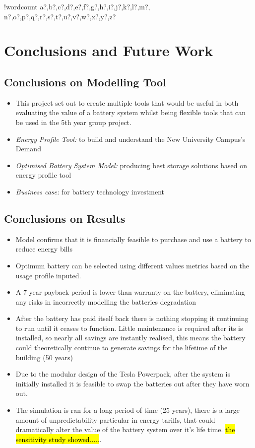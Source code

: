 \documentclass[fontsize=9.5pt]{extarticle}
\numberwithin{figure}{section} %
\providecommand{\tightlist}{%
  \setlength{\itemsep}{0pt}\setlength{\parskip}{0pt}}
\newcounter{words}
\newenvironment{counted}{%
  \setcounter{words}{0}
  \SearchList!{wordcount}{\stepcounter{words}}
    {a?,b?,c?,d?,e?,f?,g?,h?,i?,j?,k?,l?,m?,
    n?,o?,p?,q?,r?,s?,t?,u?,v?,w?,x?,y?,z?}
  \UndoBoundary{'}
  \SearchOrder{p;}}{%
  \StopSearching}
\begin{document}
\begin{counted}
\section{Conclusions and Future Work}\label{conclusions-and-future-work}

\subsection{Conclusions on Modelling
Tool}\label{conclusions-on-modelling-tool}

\begin{itemize}
\tightlist
\item
  This project set out to create multiple tools that would be useful in
  both evaluating the value of a battery system whilst being flexible
  tools that can be used in the 5th year group project.
\item
  \emph{Energy Profile Tool:} to build and understand the New University
  Campus's Demand
\item
  \emph{Optimised Battery System Model:} producing best storage
  solutions based on energy profile tool
\item
  \emph{Business case:} for battery technology investment
\end{itemize}

\subsection{Conclusions on Results}\label{conclusions-on-results}

\begin{itemize}
\tightlist
\item
  Model confirms that it is financially feasible to purchase and use a
  battery to reduce energy bills
\item
  Optimum battery can be selected using different values metrics based
  on the usage profile inputed.
\item
  A 7 year payback period is lower than warranty on the battery,
  eliminating any risks in incorrectly modelling the batteries
  degradation
\item
  After the battery has paid itself back there is nothing stopping it
  continuing to run until it ceases to function. Little maintenance is
  required after its is installed, so nearly all savings are instantly
  realised, this means the battery could theoretically continue to
  generate savings for the lifetime of the building (50 years)
\item
  Due to the modular design of the Tesla Powerpack, after the system is
  initially installed it is feasible to swap the batteries out after
  they have worn out.
\item
  The simulation is ran for a long period of time (25 years), there is a
  large amount of unpredictability particular in energy tariffs, that
  could dramatically alter the value of the battery system over it's
  life time. \hl{the sensitivity study showed.....}.
\end{itemize}


\end{counted}
\end{document}
